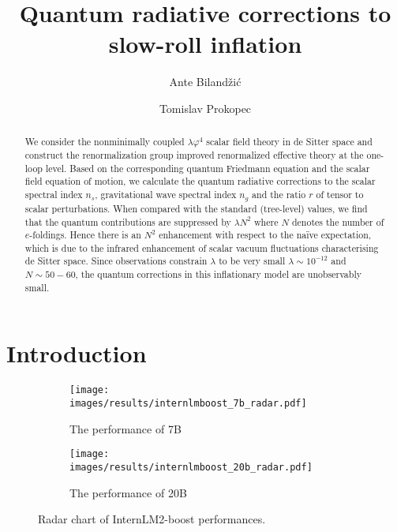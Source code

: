\documentclass[aps,12pt,superscriptaddress,preprintnumbers,
                secnumarabic,nofootinbib,showpacs]{revtex4}
\newcounter{fig}
\begin{document}

\title{\Large Quantum radiative corrections to slow-roll
inflation}

\author{Ante Biland\v{z}i\'{c}}

\author{Tomislav Prokopec}

\begin{abstract}
We consider the nonminimally coupled $\lambda\varphi^4$
scalar field theory in de Sitter space
and construct the renormalization group improved renormalized effective theory
at the one-loop level.
Based on the corresponding quantum Friedmann equation
and the scalar field equation of motion,
we calculate the quantum radiative
corrections to the scalar spectral index $n_s$, gravitational wave
spectral index $n_g$ and the ratio $r$ of tensor to scalar
perturbations. When compared with the standard (tree-level) values,
we find that the quantum contributions are suppressed by $\lambda N^2$
where $N$ denotes the number of $e$-foldings.
Hence there is an $N^2$ enhancement 
with respect to the na\"ive expectation, which is
due to the infrared enhancement of scalar vacuum fluctuations
characterising de Sitter space.
 Since observations constrain $\lambda$ to be very
small $\lambda \sim 10^{-12}$ and $N\sim 50-60$,
the quantum corrections in this inflationary model are unobservably small.

\end{abstract}


\maketitle

\section{Introduction}


\begin{figure}[!t]
  \centering
  \begin{subfigure}[b]{0.4\textwidth}
  \texttt{[image: images/results/internlmboost\_7b\_radar.pdf]}
  \caption{The performance of 7B}\label{fig:radarchart_7b}
  \end{subfigure}
  \begin{subfigure}[b]{0.4\textwidth}
  \texttt{[image: images/results/internlmboost\_20b\_radar.pdf]}
  \caption{The performance of 20B}\label{fig:radarchart_20b}
  \end{subfigure}
  \caption{Radar chart of InternLM2-boost performances.}
  \label{fig:radarchart}
\end{figure}
\end{document}
